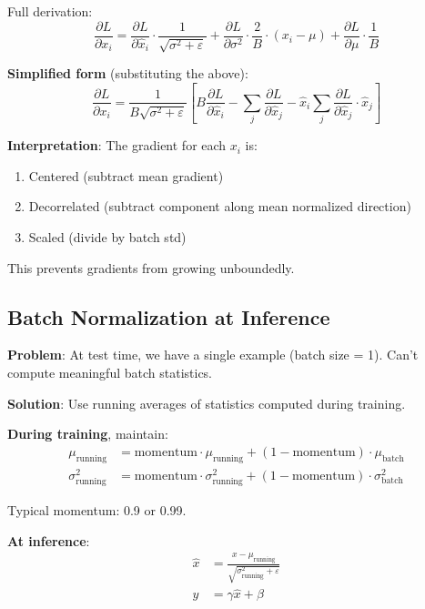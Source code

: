 \documentclass[11pt,oneside]{book}
\begin{document}
Full derivation:
\[
\frac{\partial L}{\partial x_i} = \frac{\partial L}{\partial \hat{x}_i} \cdot \frac{1}{\sqrt{\sigma^2 + \varepsilon}} + \frac{\partial L}{\partial \sigma^2} \cdot \frac{2}{B} \cdot (x_i - \mu) + \frac{\partial L}{\partial \mu} \cdot \frac{1}{B}
\]

\textbf{Simplified form} (substituting the above):
\[
\frac{\partial L}{\partial x_i} = \frac{1}{B \sqrt{\sigma^2 + \varepsilon}} \left[B \frac{\partial L}{\partial \hat{x}_i} - \sum_j \frac{\partial L}{\partial \hat{x}_j} - \hat{x}_i \sum_j \frac{\partial L}{\partial \hat{x}_j} \cdot \hat{x}_j\right]
\]

\textbf{Interpretation}: The gradient for each $x_i$ is:
\begin{enumerate}
\item Centered (subtract mean gradient)
\item Decorrelated (subtract component along mean normalized direction)
\item Scaled (divide by batch std)
\end{enumerate}

This prevents gradients from growing unboundedly.

\subsection{Batch Normalization at Inference}

\textbf{Problem}: At test time, we have a single example (batch size = 1). Can't compute meaningful batch statistics.

\textbf{Solution}: Use running averages of statistics computed during training.

\textbf{During training}, maintain:
\begin{align*}
\mu_{\text{running}} &= \text{momentum} \cdot \mu_{\text{running}} + (1 - \text{momentum}) \cdot \mu_{\text{batch}} \\
\sigma^2_{\text{running}} &= \text{momentum} \cdot \sigma^2_{\text{running}} + (1 - \text{momentum}) \cdot \sigma^2_{\text{batch}}
\end{align*}

Typical momentum: 0.9 or 0.99.

\textbf{At inference}:
\begin{align*}
\hat{x} &= \frac{x - \mu_{\text{running}}}{\sqrt{\sigma^2_{\text{running}} + \varepsilon}} \\
y &= \gamma \hat{x} + \beta
\end{align*}
\end{document}

